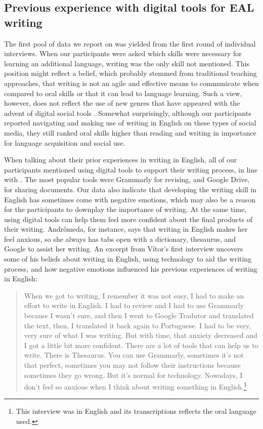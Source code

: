 \documentclass[english]{textolivre}
\begin{document}
\subsection{Previous experience with digital tools for EAL writing}

The first pool of data we report on was yielded from the first round of individual interviews. When our participants were asked which skills were necessary for learning an additional language, writing was the only skill not mentioned. This position might reflect a belief, which probably stemmed from traditional teaching approaches, that writing is not an agile and effective means to communicate when compared to oral skills or that it can lead to language learning. Such a view, however, does not reflect the use of new genres that have appeared with the advent of digital social tools \cite{elola2017writing}. Somewhat surprisingly, although our participants reported navigating and making use of writing in English on these types of social media, they still ranked oral skills higher than reading and writing in importance for language acquisition and social use.

When talking about their prior experiences in writing in English, all of our participants mentioned using digital tools to support their writing process, in line with \textcite{umamah2022efl}. The most popular tools were Grammarly for revising, and Google Drive, for sharing documents. Our data also indicate that developing the writing skill in English has sometimes come with negative emotions, which may also be a reason for the participants to downplay the importance of writing. At the same time, using digital tools can help them feel more confident about the final products of their writing. Andrômeda, for instance, says that writing in English makes her feel anxious, so she always has tabs open with a dictionary, thesaurus, and Google to assist her writing. An excerpt from Vítor’s first interview uncovers some of his beliefs about writing in English, using technology to aid the writing process, and how negative emotions influenced his previous experiences of writing in English:

\begin{quote}
    When we got to writing, I remember it was not easy, I had to make an effort to write in English. I had to review and I had to use Grammarly because I wasn't sure, and then I went to Google Tradutor and translated the text, then, I translated it back again to Portuguese. I had to be very, very sure of what I was writing. But with time, that anxiety decreased and I got a little bit more confident. There are a lot of tools that can help us to write. There is Thesaurus. You can use Grammarly, sometimes it’s not that perfect, sometimes you may not follow their instructions because sometimes they go wrong. But it’s normal for technology. Nowadays, I don’t feel so anxious when I think about writing something in English.\footnote{This interview was in English and its transcriptions reflects the oral language used.}
\end{quote}
\end{document}
